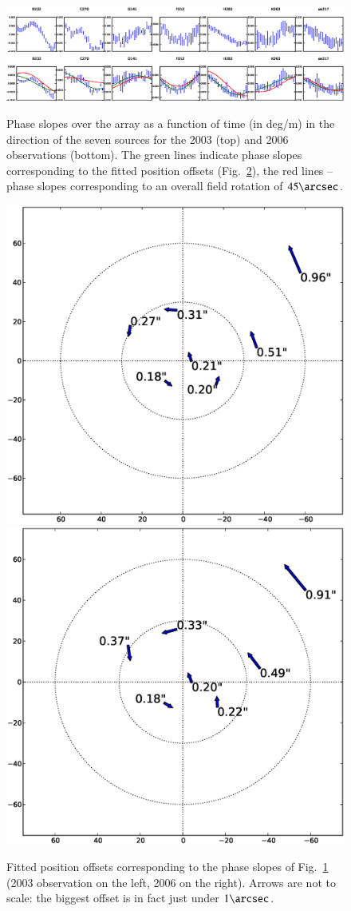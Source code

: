 \documentclass[]{aa}
\begin{document}
\begin{figure}
\centering
\includegraphics[width=\columnwidth]{o2003_dEphase_array_slopes}\\
\includegraphics[width=\columnwidth]{o2006_dEphase_array_slopes}
\caption{\label{fig:dEphase-slope}Phase slopes over the array as a function of time (in deg/m) in the direction of the seven sources for the 2003 (top) and 2006 observations (bottom). The green lines indicate phase slopes corresponding to the fitted position offsets (Fig.~\ref{fig:dEphase-dlm}), the red lines -- phase slopes corresponding to an overall field rotation of $45\arcsec$.}
\end{figure}

\begin{figure}
\centering
\includegraphics[width=.5\columnwidth]{o2003_dE_lm_offsets}%
\includegraphics[width=.5\columnwidth]{o2006_dE_lm_offsets}\\
\caption{\label{fig:dEphase-dlm}Fitted position offsets corresponding to the phase slopes of Fig.~\ref{fig:dEphase-slope} (2003 observation on the left, 2006 on the right). Arrows are not to scale: the biggest offset is in fact just under $1\arcsec$.}
\end{figure}
\end{document}
